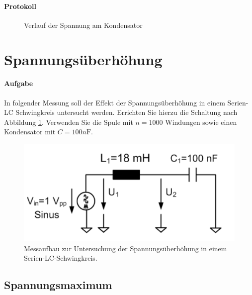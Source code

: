 \documentclass[10pt]{report}
\begin{document}
        \paragraph{Protokoll}
        \begin{center}
            \begin{figure}[H]
                \caption{Verlauf der Spannung am Kondensator}
            \end{figure}
        \end{center}

        \section{Spannungsüberhöhung}
        \paragraph{Aufgabe}
        In folgender Messung soll der Effekt der Spannungsüberhöhung in einem Serien-LC Schwingkreis
        untersucht werden. Errichten Sie hierzu die Schaltung nach Abbildung
        \ref{fig:abb18}. Verwenden Sie die Spule mit $n = 1000$ Windungen sowie einen Kondensator mit
        $C = 100\si{n\farad}$.

        \begin{center}
            \begin{figure}[H]
                \includegraphics[width=\textwidth]{Abbildung18.png}
                \caption{Messaufbau zur Untersuchung der Spannungsüberhöhung in einem
                    Serien-LC-Schwingkreis.}
                \label{fig:abb18}
            \end{figure}
        \end{center}

        \subsection{Spannungsmaximum}
\end{document}
